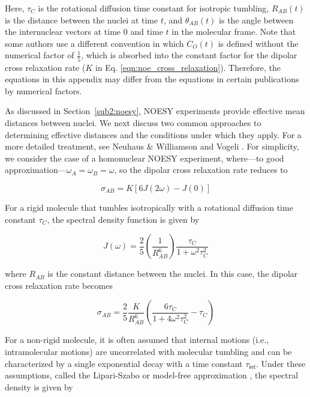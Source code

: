 \documentclass[9pt,review,pubversion]{livecoms}
\begin{document}
\noindent Here, $\tau_C$ is the rotational diffusion time constant for isotropic tumbling, $R_{AB}(t)$ is the distance between the nuclei at time $t$, and $\theta_{AB}(t)$ is the angle between the internuclear vectors at time $0$ and time $t$ in the molecular frame.
Note that some authors use a different convention in which $C_O(t)$ is defined without the numerical factor of $\frac {1} {5}$, which is absorbed into the constant factor for the dipolar cross relaxation rate ($K$ in Eq. \ref{eqn:noe_cross_relaxation}).
Therefore, the equations in this appendix may differ from the equations in certain publications by numerical factors.

As discussed in Section~\ref{sub2:noesy}, NOESY experiments provide effective mean distances between nuclei.
We next discuss two common approaches to determining effective distances and the conditions under which they apply.
For a more detailed treatment, see Neuhaus \& Williamson \cite{neuhaus_nuclear_2000} and Vogeli \cite{vogeli_nuclear_2014}.
For simplicity, we consider the case of a  homonuclear NOESY experiment, where---to good approximation---$\omega_A = \omega_B = \omega$, so the dipolar cross relaxation rate reduces to

\begin{equation}
\label{eqn:noe_homonuclear}
\sigma_{AB} = K \left[ 6 J(2 \omega) - J(0) \right]
\end{equation}

For a rigid molecule that tumbles isotropically with a rotational diffusion time constant $\tau_C$, the spectral density function is given by

\begin{equation}
\label{eqn:noe_rigid_spectral_density}
J(\omega) = \frac {2} {5} \left( \frac {1} {R_{AB}^6} \right) \frac {\tau_C} {1 + \omega^2 \tau_C^2}
\end{equation}

\noindent where $R_{AB}$ is the constant distance between the nuclei. In this case, the dipolar cross relaxation rate becomes

\begin{equation}
\label{eqn:noe_rigid_cross_relaxation}
\sigma_{AB} = \frac {2} {5} \frac {K} {R_{AB}^6} \left( \frac {6 \tau_C} {1 + 4 \omega^2 \tau_C^2} - \tau_C \right)
\end{equation}

For a non-rigid molecule, it is often assumed that internal motions (i.e., intramolecular motions) are uncorrelated with molecular tumbling and can be characterized by a single exponential decay with a time constant $\tau_{\mathsf{int}}$.
Under these assumptions, called the Lipari-Szabo or model-free approximation \cite{lipari_model-free_1982}, the spectral density is given by
\end{document}
